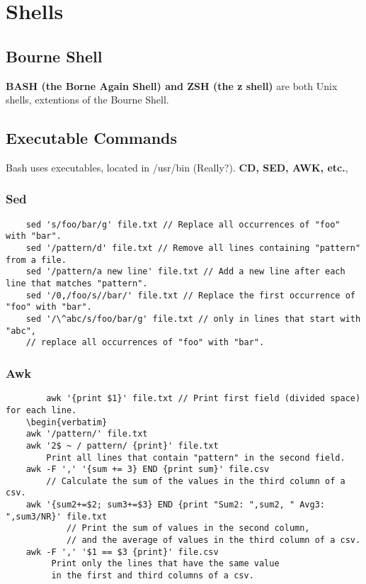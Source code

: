 
\chapter{Shells}

\section{Bourne Shell}

\textbf{BASH (the Borne Again Shell) and ZSH (the z shell)} are both Unix shells, extentions of the Bourne Shell.

\section{Executable Commands}

Bash uses executables, located in /usr/bin (Really?). \textbf{CD, SED, AWK, etc.}, 

    \subsection{Sed}

    \begin{verbatim}
    sed 's/foo/bar/g' file.txt // Replace all occurrences of "foo" with "bar".
    sed '/pattern/d' file.txt // Remove all lines containing "pattern" from a file.
    sed '/pattern/a new line' file.txt // Add a new line after each line that matches "pattern".
    sed '/0,/foo/s//bar/' file.txt // Replace the first occurrence of "foo" with "bar".
    sed '/\^abc/s/foo/bar/g' file.txt // only in lines that start with "abc", 
    // replace all occurrences of "foo" with "bar".
    \end{verbatim}
    \subsection{Awk}
    \begin{verbatim}
        awk '{print $1}' file.txt // Print first field (divided space) for each line.
    \begin{verbatim}
    awk '/pattern/' file.txt
    awk '2$ ~ / pattern/ {print}' file.txt 
        Print all lines that contain "pattern" in the second field.
    awk -F ',' '{sum += 3} END {print sum}' file.csv 
        // Calculate the sum of the values in the third column of a csv.
    awk '{sum2+=$2; sum3+=$3} END {print "Sum2: ",sum2, " Avg3: ",sum3/NR}' file.txt
            // Print the sum of values in the second column,
            // and the average of values in the third column of a csv.
    awk -F ',' '$1 == $3 {print}' file.csv 
         Print only the lines that have the same value
         in the first and third columns of a csv.
    \end{verbatim}
